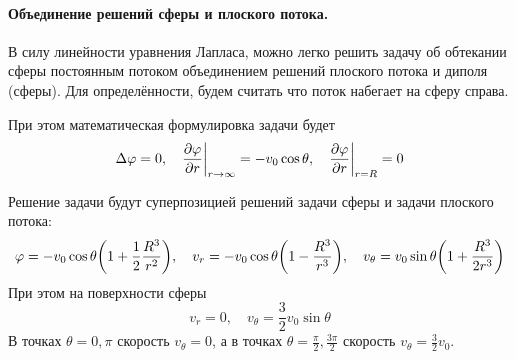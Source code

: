 \paragraph{Объединение решений сферы и плоского потока.} В силу линейности уравнения Лапласа, можно легко решить задачу об обтекании сферы постоянным потоком объединением решений плоского потока и диполя (сферы). Для определённости, будем считать что поток набегает на сферу справа. 

При этом математическая формулировка задачи будет
\begin{equation}
    \Delta \varphi = 0, \quad
    \pdv{\varphi}{r}\bigg|_{r\to \infty} = -v_0 \cos\theta, \quad
    \pdv{\varphi}{r}\bigg|_{r=R} = 0
\end{equation}

Решение задачи будут суперпозицией решений задачи сферы и задачи плоского потока:
\begin{equation}
    \varphi = -v_0 \cos\theta \qty(1+\frac{1}{2}\frac{R^3}{r^2}), \quad
    v_r = -v_0\cos\theta \qty(1-\frac{R^3}{r^3}), \quad
    v_\theta = v_0\sin\theta \qty(1+\frac{R^3}{2r^3})
\end{equation}
При этом на поверхности сферы
\begin{equation}
    v_r = 0, \quad
    v_\theta = \frac{3}{2}v_0\sin\theta
\end{equation}
В точках $\theta=0,\pi$ скорость $v_\theta=0$, а в точках $\theta=\frac{\pi}{2}, \frac{3\pi}{2}$ скорость $v_\theta=\frac{3}{2}v_0$.

